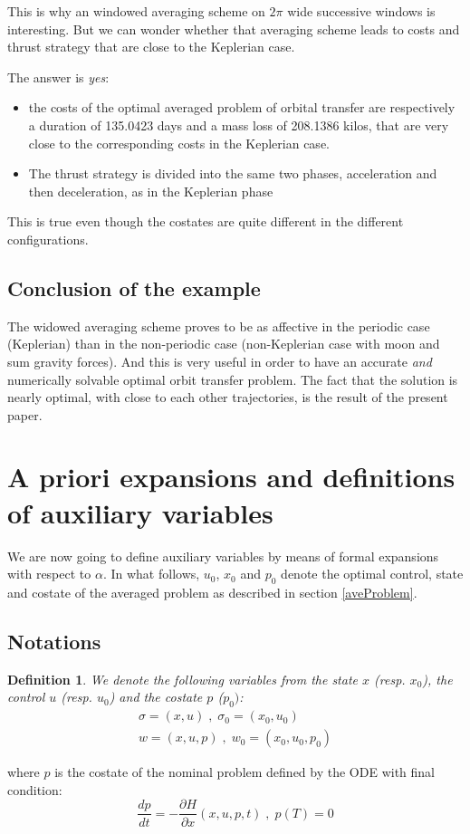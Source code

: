 \documentclass[a4paper,10pt]{article}
\newtheorem{definition}{Definition}
\begin{document}
This is why an windowed averaging scheme on $2 \pi$ wide successive 
windows is interesting. But we can wonder whether that averaging 
scheme leads to costs and thrust strategy that are close to the 
Keplerian case. 

The answer is \emph{yes}:
\begin{itemize}
\item the costs of the optimal averaged problem of orbital transfer 
are respectively a duration of 135.0423 days and a mass loss of 
208.1386 kilos, that are very close to the corresponding costs in the 
Keplerian case.
\item The thrust strategy is divided into the same two phases, 
acceleration and then deceleration, as in the Keplerian phase
\end{itemize}
This is true even though the costates are quite different in the different 
configurations.
\subsection{Conclusion of the example}
The widowed averaging scheme proves to be as affective in the 
periodic case (Keplerian) than in the non-periodic case 
(non-Keplerian case with moon and sum gravity forces).
And this is very useful in order to have an accurate \emph{and} numerically 
solvable optimal orbit transfer problem.
The fact that the solution is nearly optimal, with close to each other 
trajectories, is the result of the present paper.

\section{A priori expansions and definitions of auxiliary 
variables}\label{expansions}
We are now going to define auxiliary variables by means of formal 
expansions with respect to $\alpha$. In what follows, $u_{0}$, 
$x_{0}$ and $p_{0}$ denote the optimal control, state and costate of 
the averaged problem as described in section \ref{aveProblem}.
\subsection{Notations}
 \begin{definition}
    We denote the following variables from the state $x$ (resp. $x_{0}$), the control 
    $u$ (resp. $u_{0}$) and the costate $p$ ($p_{0})$:
    \begin{align*}
	\sigma = (x,u) \; , \; \sigma_{0} = (x_{0},u_{0}) \\
	w = (x,u,p) \; , \; w_{0} = (x_{0},u_{0},p_{0})
    \end{align*}
\end{definition}
where $p$ is the costate of the nominal problem defined by the ODE 
with final condition:
    \begin{equation}
        \frac{dp}{dt}=-\frac{\partial H}{\partial x}
	                              (x,u,p,t)\; , \; p(T)=0
        \label{Costate}
    \end{equation}
	
\end{document}
